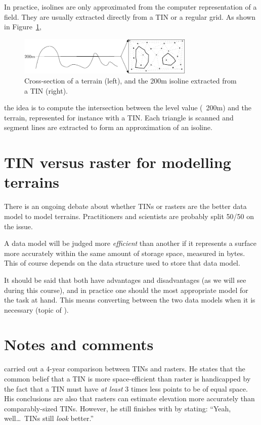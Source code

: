 %

In practice, isolines are only approximated from the computer representation of a field.
They are usually extracted directly from a TIN or a regular grid. 
As shown in Figure~\ref{fig:isoline},
\begin{figure}
  \centering
  \includegraphics[width=0.75\textwidth]{figs/isoline}
  \caption{Cross-section of a terrain (left), and the 200m isoline extracted from a TIN (right).} 
\label{fig:isoline}
\end{figure}
the idea is to compute the intersection between the level value (\eg\ 200m) and the terrain, represented for instance with a TIN\@. 
Each triangle is scanned and segment lines are extracted to form an approximation of an isoline.


%
\section{TIN versus raster for modelling terrains}

There is an ongoing debate about whether TINs or rasters are the better data model to model terrains.
Practitioners and scientists are probably split 50/50 on the issue.

A data model will be judged more \emph{efficient} than another if it represents a surface more accurately within the same amount of storage space, measured in bytes.
This of course depends on the data structure used to store that data model.

It should be said that both have advantages and disadvantages (as we will see during this course), and in practice one should the most appropriate model for the task at hand.
This means converting between the two data models when it is necessary (topic of ).


%
\section{Notes and comments}

\citet{Kumler94} carried out a 4-year comparison between TINs and rasters.
He states that the common belief that a TIN is more space-efficient than raster is handicapped by the fact that a TIN must have \emph{at least} 3 times less points to be of equal space.
His conclusions are also that rasters can estimate elevation more accurately than comparably-sized TINs.
However, he still finishes with by stating: ``Yeah, well\ldots\ TINs still \emph{look} better.'' 

